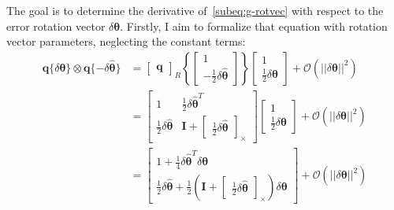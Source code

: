The goal is to determine the derivative of~\eqref{subeq:g-rotvec} with respect to the error rotation vector $\delta\boldsymbol{\theta}$. Firstly, I aim to formalize that equation with rotation vector parameters, neglecting the constant terms:
\begin{equation}
\begin{aligned}
    \mathbf{q}\{\delta\boldsymbol{\theta}\} \otimes \mathbf{q}\{-\delta\hat{\boldsymbol{\theta}}\} &=  \begin{bmatrix} \mathbf{q}\end{bmatrix}_R\left\{\begin{bmatrix}
        1 \\ -\frac{1}{2}\delta\hat{\boldsymbol{\theta}}
    \end{bmatrix}\right\} 
    \begin{bmatrix} 1 \\ \frac{1}{2}\delta\boldsymbol{\theta} \end{bmatrix} + \mathcal{O}(||\delta\boldsymbol{\theta}||^2) \\
    &=
    \begin{bmatrix}
        1 & \frac{1}{2}\delta\hat{\boldsymbol{\theta}}^T \\
        \frac{1}{2}\delta\hat{\boldsymbol{\theta}} & \mathbf{I}+\begin{bmatrix}
            \frac{1}{2}\delta\hat{\boldsymbol{\theta}}
        \end{bmatrix}_\times 
    \end{bmatrix}  \begin{bmatrix} 1 \\ \frac{1}{2}\delta\boldsymbol{\theta} \end{bmatrix}+\mathcal{O}(||\delta\boldsymbol{\theta}||^2)  \\ &=
    \begin{bmatrix}
        1+\frac{1}{4}\delta\hat{\boldsymbol{\theta}}^T\delta\boldsymbol{\theta} \\
        \frac{1}{2}\delta\hat{\boldsymbol{\theta}}+\frac{1}{2}\left(\mathbf{I}+\begin{bmatrix}
            \frac{1}{2}\delta\hat{\boldsymbol{\theta}}
        \end{bmatrix}_\times\right)\delta\boldsymbol{\theta}
    \end{bmatrix}+\mathcal{O}(||\delta\boldsymbol{\theta}||^2) 
\end{aligned}
\end{equation}

